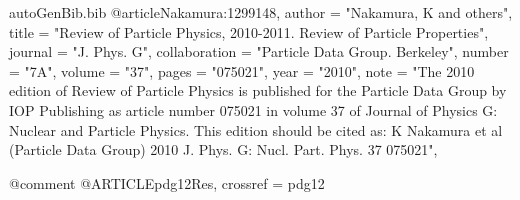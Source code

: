 \begin{filecontents*}{autoGenBib.bib}
@article{Nakamura:1299148,
      author        = "Nakamura, K and others",
      title         = "{Review of Particle Physics, 2010-2011. Review of Particle
                       Properties}",
      journal       = "J. Phys. G",
      collaboration = "Particle Data Group. Berkeley",
      number        = "7A",
      volume        = "37",
      pages         = "075021",
      year          = "2010",
      note          = "The 2010 edition of Review of Particle Physics is
                       published for the Particle Data Group by IOP Publishing as
                       article number 075021 in volume 37 of Journal of Physics G:
                       Nuclear and Particle Physics. This edition should be cited
                       as: K Nakamura et al (Particle Data Group) 2010 J. Phys. G:
                       Nucl. Part. Phys. 37 075021",
}

@comment %
@ARTICLE{pdg12Res,
    crossref = {pdg12}
}



\end{filecontents*}
